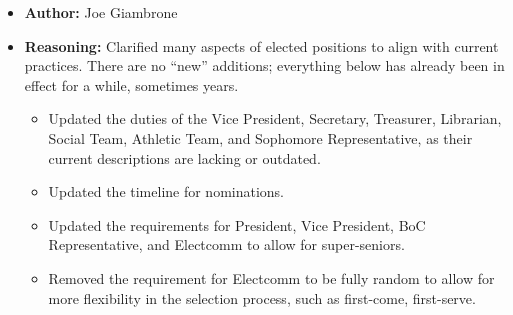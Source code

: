 \documentclass[10pt]{article} %
\begin{document}
\begin{itemize}
    \item \textbf{Author:} Joe Giambrone
    \item \textbf{Reasoning:} Clarified many aspects of elected positions to align with current practices. There are no ``new'' additions; everything below has already been in effect for a while, sometimes years.
    \begin{itemize}
        \item Updated the duties of the Vice President, Secretary, Treasurer, Librarian, Social Team, Athletic Team, and Sophomore Representative, as their current descriptions are lacking or outdated.
        \item Updated the timeline for nominations.
        \item Updated the requirements for President, Vice President, BoC Representative, and Electcomm to allow for super-seniors.
        \item Removed the requirement for Electcomm to be fully random to allow for more flexibility in the selection process, such as first-come, first-serve.
    \end{itemize}


\end{itemize}
\end{document}
